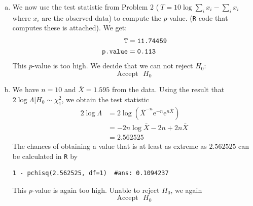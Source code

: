 \documentclass[12pt]{article}
\begin{document}
\begin{enumerate}[(a)]


\item We now use the test statistic from Problem 2 ($ \ T = 10 \log \sum_i x_i - \sum_i x_i \ $ where $x_i$ are the observed data) to compute the $p$-value. (\texttt{R} code that computes these is attached). We get:
\begin{align*}
\text{\texttt{T}} &= \text{\texttt{11.74459}} \\
\text{\texttt{p.value}} &= \text{\texttt{0.113}}
\end{align*}
This $p$-value is too high. We decide that we can not reject $H_0$:
$$
\boxed{\text{Accept} \ \ \ H_0}
$$ 
\item 
We have $n = 10$ and $ \bar X = 1.595$ from the data. Using the result that $ 2 \log \Lambda | H_0 \sim \chi^2_1 $, we obtain the test statistic
\begin{align*}
2 \log \Lambda &= 2 \log \left( \bar X^{-n} \mathrm{e}^{ -n } \mathrm{e}^{n \bar X} \right)\\
&= - 2 n \log \bar X - 2 n  + 2 n \bar X \\ 
&= 2.562525
\end{align*}
The chances of obtaining a value that is at least as extreme as $2.562525$ can be calculated in \texttt{R} by 
\begin{verbatim}
1 - pchisq(2.562525, df=1)  #ans: 0.1094237
\end{verbatim} 
This $p$-value is again too high. Unable to reject $H_0$, we  again
$$
\boxed{\text{Accept} \ \ \ H_0}
$$ 



\end{enumerate}
\end{document}
